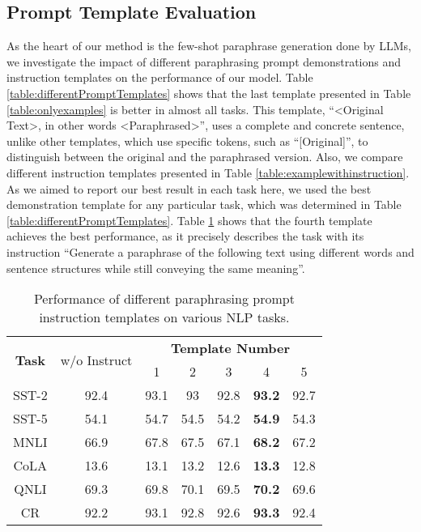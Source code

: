 \documentclass[11pt]{article}
\begin{document}
\subsection{Prompt Template Evaluation}
\label{subsec:templateEvaluation}
As the heart of our method is the few-shot paraphrase generation done 
by LLMs, we investigate the impact of different paraphrasing prompt demonstrations and instruction templates on the performance of our model. Table \ref{table:differentPromptTemplates} shows that the last template presented in Table \ref{table:onlyexamples} is better in almost all tasks. 
This template, ``<Original Text>, in other words <Paraphrased>'', uses a complete and concrete sentence, unlike other templates, which use specific tokens, such as ``[Original]'', to distinguish between the original and the paraphrased version. 
Also, we compare different instruction templates presented in Table \ref{table:examplewithinstruction}. As we aimed to report our best result in each task here, we used the best demonstration template for any particular task, which was determined in Table \ref{table:differentPromptTemplates}. Table \ref{table:promptInstructionTemplate} shows that the fourth template achieves the best performance, as it precisely describes the task with its instruction ``Generate a paraphrase of the following text using different words and sentence structures while still conveying the same meaning''.

\begin{table}[]
    \small
    \tabcolsep=0.14cm
    \centering
    \begin{tabular}{c|c|ccccc}
    \toprule
        \multirow{2}{*}{\textbf{Task}} & \multirow{2}{*}{w/o Instruct} & \multicolumn{5}{c}{\textbf{Template Number}}       \\
                              &                                      & 1    & 2    & 3    & 4             & 5    \\ \hline
        SST-2                 & 92.4                                 & 93.1 & 93   & 92.8 & \textbf{93.2} & 92.7 \\
        SST-5                 & 54.1                                 & 54.7 & 54.5 & 54.2 & \textbf{54.9} & 54.3 \\
        MNLI                  & 66.9                                 & 67.8 & 67.5 & 67.1 & \textbf{68.2} & 67.2 \\
        CoLA                  & 13.6                                 & 13.1 & 13.2 & 12.6 & \textbf{13.3} & 12.8 \\
        QNLI                  & 69.3                                 & 69.8 & 70.1 & 69.5 & \textbf{70.2} & 69.6 \\
        CR                    & 92.2                                 & 93.1 & 92.8 & 92.6 & \textbf{93.3} & 92.4 \\ \bottomrule
    \end{tabular}
    \caption{Performance of different paraphrasing prompt instruction templates on various NLP tasks. 
    \label{table:promptInstructionTemplate}}
\end{table}
\end{document}
